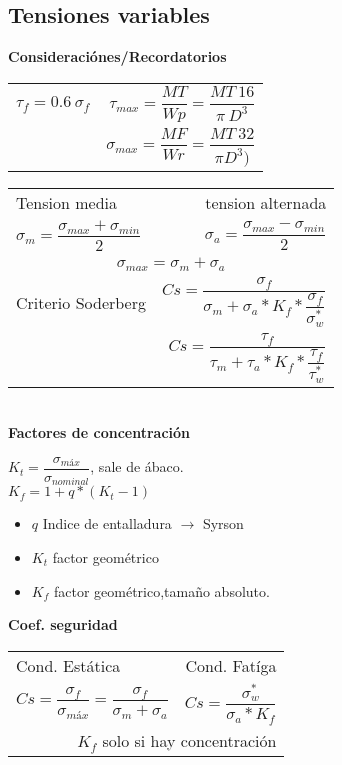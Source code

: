 \documentclass[11pt,a4paper]{article}
\begin{document}
\begin{multicols}{2}
\begin{cajita}
	\end{cajita}


	\begin{cajita}
		\section*{Tensiones variables}
		\begin{cajita}
			\textbf{Consideraciónes/Recordatorios}\\\vspace{0.2cm}
			\begin{tabular}{l|r}
				$\tau_{f}=0.6~\sigma_{f}$ & $\tau_{max}=\dfrac{MT}{Wp}=\dfrac{MT~16}{\pi~D^{3}}$\\[0.3 cm]
				& $\sigma_{max}=\dfrac{MF}{Wr}=\dfrac{MT~32}{\pi D^{3})}$\\[0.2 cm]
			\end{tabular}
		\end{cajita}
		\begin{tabular}{l r}
			Tension media & tension alternada\\
			$\sigma_{m}=\dfrac{\sigma_{max}+\sigma_{min}}{2}$&$\sigma_{a}=\dfrac{\sigma_{max}-\sigma_{min}}{2}$\\[0.3cm]
			\multicolumn{2}{c}{$\sigma_{max}=\sigma_{m}+\sigma_{a}$}\\[0.3cm]
			Criterio Soderberg & $Cs=\dfrac{\sigma_{f}}{\sigma_{m}+\sigma_{a}*K_{f}*\dfrac{\sigma_{f}}{\sigma_{w}^{*}}}$\\[0.3cm]
			& $Cs=\dfrac{\tau_{f}}{\tau_{m}+\tau_{a}*K_{f}*\dfrac{\tau_{f}}{\tau_{w}^{*}}}$\\
		\end{tabular}\\
	\textbf{Factores de concentración}
	
	$K_{t}=\dfrac{\sigma_{máx}}{\sigma_{nominal}}$, sale de ábaco.\\ \vspace*{0.2cm}
	$K_{f}=1+q*\left(K_{t}-1\right)$
		\begin{itemize}[itemsep=-2mm]
		\item $q$ Indice de entalladura $\rightarrow$ Syrson
		\item $K_{t}$ factor geométrico
		\item $K_{f}$ factor geométrico,tamaño absoluto.
	\end{itemize}

	\textbf{Coef. seguridad}\\
		\begin{tabular}{l r}
			\hline
			Cond. Estática & Cond. Fatíga\\
			$Cs=\dfrac{\sigma_{f}}{\sigma_{máx}}=\dfrac{\sigma_{f}}{\sigma_{m}+\sigma_{a}}$ & $Cs=\dfrac{\sigma_{w}^{*}}{\sigma_{a}*K_{f}}$ \\
			\multicolumn{2}{r}{ $K_{f}$ solo si hay concentración} \\
			\hline
		\end{tabular}
	

\end{cajita}
\end{multicols}
\end{document}
